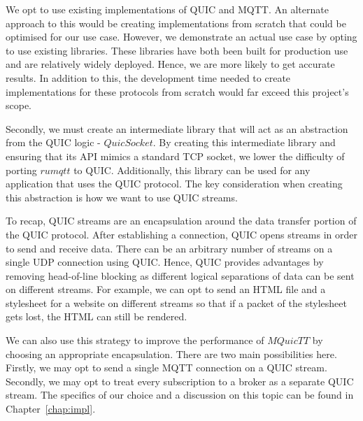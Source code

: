 We opt to use existing implementations of QUIC and MQTT.
An alternate approach to this would be creating implementations from scratch that could be optimised for our use case.
However, we demonstrate an actual use case by opting to use existing libraries.
These libraries have both been built for production use and are relatively widely deployed.
Hence, we are more likely to get accurate results.
In addition to this, the development time needed to create implementations for these protocols from scratch would far exceed this project's scope.

Secondly, we must create an intermediate library that will act as an abstraction from the QUIC logic - $QuicSocket$.
By creating this intermediate library and ensuring that its API mimics a standard TCP socket, we lower the difficulty of porting $rumqtt$ to QUIC.
Additionally, this library can be used for any application that uses the QUIC protocol.
The key consideration when creating this abstraction is how we want to use QUIC streams.

To recap, QUIC streams are an encapsulation around the data transfer portion of the QUIC protocol.
After establishing a connection, QUIC opens streams in order to send and receive data.
There can be an arbitrary number of streams on a single UDP connection using QUIC.
Hence, QUIC provides advantages by removing head-of-line blocking as different logical separations of data can be sent on different streams.
For example, we can opt to send an HTML file and a stylesheet for a website on different streams so that if a packet of the stylesheet gets lost, the HTML can still be rendered.

We can also use this strategy to improve the performance of $MQuicTT$ by choosing an appropriate encapsulation.
There are two main possibilities here.
Firstly, we may opt to send a single MQTT connection on a QUIC stream.
Secondly, we may opt to treat every subscription to a broker as a separate QUIC stream.
The specifics of our choice and a discussion on this topic can be found in Chapter~\ref{chap:impl}.

